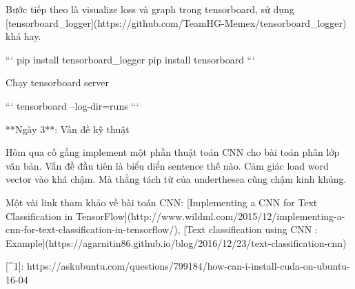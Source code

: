 Bước tiếp theo là visualize loss và graph trong tensorboard, sử dụng [tensorboard_logger](https://github.com/TeamHG-Memex/tensorboard_logger) khá hay.

```
pip install tensorboard_logger
pip install tensorboard
```

Chạy tensorboard server

```
tensorboard --log-dir=runs
```

**Ngày 3**: Vấn đề kỹ thuật

Hôm qua cố gắng implement một phần thuật toán CNN cho bài toán phân lớp văn bản. Vấn đề đầu tiên là biểu diển sentence thế nào. Cảm giác load word vector vào khá chậm. Mà thằng tách từ của underthesea cũng chậm kinh khủng.

Một vài link tham khảo về bài toán CNN: [Implementing a CNN for Text Classification in TensorFlow](http://www.wildml.com/2015/12/implementing-a-cnn-for-text-classification-in-tensorflow/), [Text classification using CNN : Example](https://agarnitin86.github.io/blog/2016/12/23/text-classification-cnn)

[^1]: https://askubuntu.com/questions/799184/how-can-i-install-cuda-on-ubuntu-16-04


